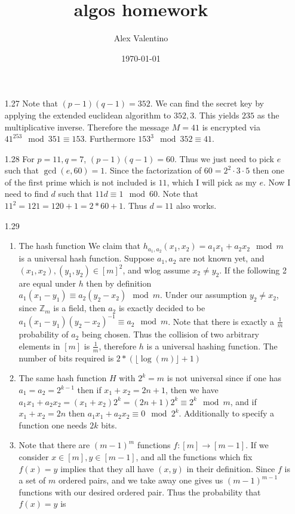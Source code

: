 \documentclass[12pt, letterpaper]{article}
\date{\today}
\author{Alex Valentino}
\title{algos homework}
\newcommand{\Z}{\mathbb{Z}}
\begin{document}
\begin{enumerate}
	\item[1.27] Note that $(p-1)(q-1) = 352$.  We can find the secret key by applying 
	the extended euclidean algorithm to $352,3$.  This yields $235$ as the multiplicative 
	inverse.  Therefore the message $M = 41$ is encrypted via $41^{253} \mod{351} \equiv 153$.
	Furthermore $153^3 \mod{352} \equiv 41$.  
	\item[1.28] For $p=11, q=7$, $(p-1)(q-1) = 60$.  Thus we just need to pick $e$ such that 
	$\gcd(e,60) = 1$.   Since the factorization of $60 = 2^2 \cdot 3 \cdot 5$ then one of the
 	first prime which is not included is $11$, which I will pick as my $e$.  Now I need to find $d$
	such that $11d \equiv 1 \mod{60}$.  Note that $11^2 = 121 = 120 + 1 = 2*60 + 1$.  Thus 
	$d=11$ also works.  
	\item[1.29]
	\begin{enumerate}
		\item The hash function 
		We claim that $h_{a_1, a_2}(x_1, x_2) = a_1 x_1 + a_2 x_2 \mod{m}$ 
		is a universal hash function.  Suppose $a_1, a_2$ are 
		not known yet, and $(x_1,x_2),(y_1,y_2) \in [m]^2$, and 
		wlog assume $x_2 \neq y_2$.  If the following 2 are equal 
		under $h$ then by definition $a_1(x_1 - y_1) \equiv a_2(y_2 - x_2) \mod{m}$.   Under our assumption $y_2 \neq x_2$, since $\Z_m$ is a field, then $a_2$ is exactly decided to be $a_1 (x_1 - y_1)(y_2 - x_2)^{-1} \equiv a_2 \mod{m}$.  Note that there is exactly a 
		$\frac{1}{m}$ probability of $a_2$ being chosen.  Thus the 
		collision of two arbitrary elements in $[m]$ is $\frac{1}{m}$,
		therefore $h$ is a universal hashing function.
		The number of bits required is 
		$2*(\lfloor \log(m)\rfloor  + 1)$
		\item The same hash function $H$ with $2^k = m$ is not 
		universal since if one has $a_1 = a_2 = 2^{k-1}$ then 
		if $x_1 + x_2 = 2n+1$, then we have $a_1 x_1 + a_2 x_2 = 
		(x_1 + x_2)2^k = (2n+1)2^k \equiv 2^k \mod{m}$, and if 
		$x_1 + x_2 = 2n$ then $a_1 x_1 + a_2 x_2 \equiv 0 \mod{2^k}$.
		Additionally to specify a function one needs $2k$ bits.  
		\item Note that there are $(m-1)^m$ functions 
		$f: [m] \to [m-1]$.  If we consider $x \in [m], y \in [m-1]$,
		and all the functions which fix $f(x) = y$ implies that 
		they all have $(x,y)$ in their definition.  Since $f$ is a 
		set of $m$ ordered pairs, and we take away one gives us 
		$(m-1)^{m-1}$ functions with our desired ordered pair.  Thus 
		the probability that $f(x) = y$ is 

\end{enumerate}
\end{enumerate}
\end{document}
